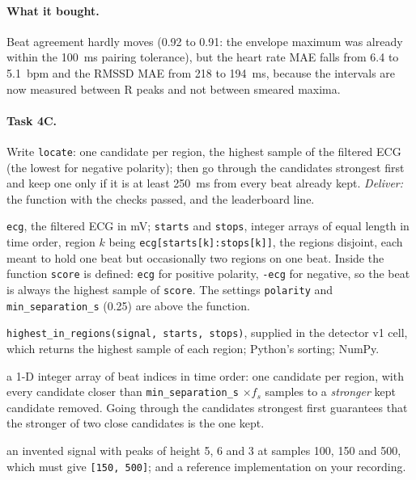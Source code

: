 \documentclass[12pt,article,oneside,linkcolour=blue]{oxengthesis}
\begin{document}
\paragraph{What it bought.} Beat agreement hardly moves (0.92 to 0.91: the envelope maximum was
already within the \SI{100}{\milli\second} pairing tolerance), but the heart rate MAE falls
from 6.4 to \SI{5.1}{bpm} and the RMSSD MAE from 218 to \SI{194}{\milli\second}, because the
intervals are now measured between R peaks and not between smeared maxima.

\paragraph{Task 4C.} Write \texttt{locate}: one candidate per region, the highest
sample of the filtered ECG (the lowest for negative polarity); then go through the candidates
strongest first and keep one only if it is at least \SI{250}{\milli\second} from every beat
already kept. \emph{Deliver:} the function with the checks passed, and the leaderboard line.

\begin{tcolorbox}[breakable, title=Specification: \texttt{locate(ecg, starts, stops)}, colback=white, colframe=black!60]
\begin{description}[leftmargin=*, itemsep=2pt, font=\bfseries]
  \item[Given] \texttt{ecg}, the filtered ECG in mV; \texttt{starts} and \texttt{stops}, integer arrays of equal length in time order, region $k$ being \texttt{ecg[starts[k]:stops[k]]}, the regions disjoint, each meant to hold one beat but occasionally two regions on one beat. Inside the function \texttt{score} is defined: \texttt{ecg} for positive polarity, \texttt{-ecg} for negative, so the beat is always the highest sample of \texttt{score}. The settings \texttt{polarity} and \texttt{min\_separation\_s} (0.25) are above the function.
  \item[You may use] \texttt{highest\_in\_regions(signal, starts, stops)}, supplied in the detector v1 cell, which returns the highest sample of each region; Python's sorting; NumPy.
  \item[Return] a 1-D integer array of beat indices in time order: one candidate per region, with every candidate closer than \texttt{min\_separation\_s} $\times f_s$ samples to a \emph{stronger} kept candidate removed. Going through the candidates strongest first guarantees that the stronger of two close candidates is the one kept.
  \item[Checked by] an invented signal with peaks of height 5, 6 and 3 at samples 100, 150 and 500, which must give \texttt{[150, 500]}; and a reference implementation on your recording.
\end{description}
\end{tcolorbox}
\end{document}
